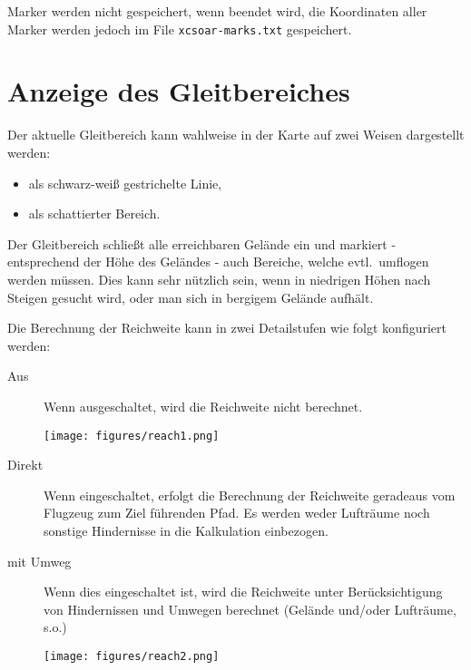 Marker werden nicht gespeichert, wenn \xc beendet wird, die Koordinaten aller Marker werden jedoch im File \verb|xcsoar-marks.txt| gespeichert.

\section{Anzeige des Gleitbereiches}\label{sec:reach}

Der aktuelle Gleitbereich kann wahlweise in der Karte auf zwei Weisen dargestellt werden:
\begin{itemize}
    \item als schwarz-weiß gestrichelte Linie, 
    \item als schattierter Bereich.
\end{itemize}
Der Gleitbereich schließt alle erreichbaren Gelände ein und markiert - entsprechend der Höhe des Geländes - auch Bereiche, welche evtl.\ umflogen werden müssen.  Dies kann sehr nützlich sein, wenn in niedrigen Höhen nach Steigen gesucht wird, oder man sich in bergigem Gelände aufhält.

Die Berechnung der Reichweite  kann in zwei Detailstufen  wie folgt konfiguriert werden:

\begin{description}
\item[Aus] Wenn ausgeschaltet, wird die Reichweite nicht berechnet.
\begin{center}
\texttt{[image: figures/reach1.png]}
\end{center}
\item[Direkt] Wenn eingeschaltet, erfolgt die Berechnung der Reichweite geradeaus vom Flugzeug zum Ziel führenden Pfad. Es werden weder Lufträume noch sonstige Hindernisse in die Kalkulation einbezogen.
 \item[mit Umweg] Wenn dies eingeschaltet ist, wird die Reichweite unter Berücksichtigung von Hindernissen und Umwegen berechnet (Gelände und/oder Lufträume, s.o.)
\begin{center}
\texttt{[image: figures/reach2.png]}
\end{center}
\end{description}

